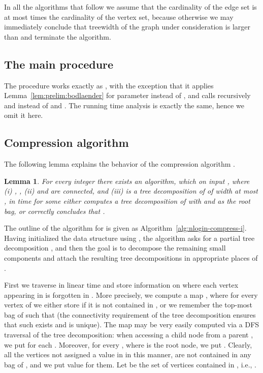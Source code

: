 \documentclass[a4paper,11pt]{article}
\newtheorem{lemma}{Lemma}[section]
\theoremstyle{definition}
\theoremstyle{remark}
\begin{document}
In all the algorithms that follow we assume that the cardinality of
the edge set is at most  times the cardinality of the vertex set,
because otherwise we may immediately conclude that treewidth of the
graph under consideration is larger than  and terminate the
algorithm.

\subsection{The main procedure }

The procedure  works exactly as , with the
exception that it applies Lemma~\ref{lem:prelim:bodlaender} for
parameter  instead of , and calls recursively
 and  instead of  and
.  The running time analysis is exactly the same, hence
we omit it here.

\subsection{Compression algorithm}

The following lemma explains the behavior of the compression algorithm
.

\begin{lemma}
  \label{lemma:nlogin-compression}
  For every integer  there exists an algorithm, which on
  input , where (i) , , (ii)  and  are connected, and (iii)
   is a tree decomposition of  of width at most ,
  in  time for some  either computes a tree decomposition  of  with
   and  as the root bag, or correctly
  concludes that .
\end{lemma}

The outline of the algorithm  for  is
given as Algorithm~\ref{alg:nlogin-compress-i}.  Having initialized
the data structure using , the algorithm asks  for
a partial tree decomposition , and then the goal is to decompose
the remaining small components and attach the resulting tree
decompositions in appropriate places of .

First we traverse  in linear time and store information on where
each vertex appearing in  is forgotten in .  More
precisely, we compute a map ,
where for every vertex  of  we either store  if it is not
contained in , or we remember the top-most bag  of 
such that  (the connectivity requirement of the tree
decomposition ensures that such  exists and is unique).  The map
 may be very easily computed via a DFS traversal of the tree
decomposition: when accessing a child node  from a parent , we
put  for each .  Moreover, for
every , where  is the root node, we put .
Clearly, all the vertices not assigned a value in  in this
manner, are not contained in any bag of , and we put value
 for them.  Let  be the set of vertices contained in ,
i.e., .
\end{document}
